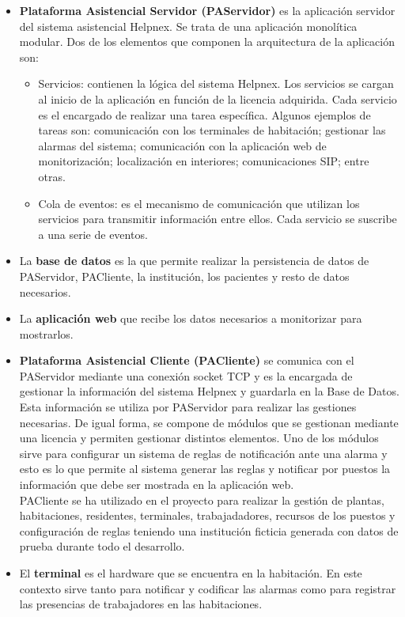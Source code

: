 \begin{itemize}
	\item \textbf{Plataforma Asistencial Servidor (PAServidor)} es la aplicación servidor del sistema asistencial Helpnex. Se trata de una aplicación monolítica modular. Dos de los elementos que componen la arquitectura de la aplicación son:
	\begin{itemize}
		\item Servicios: contienen la lógica del sistema Helpnex. Los servicios se cargan al inicio de la aplicación en función de la licencia adquirida. Cada servicio es el encargado de realizar una tarea específica. Algunos ejemplos de tareas son: comunicación con los terminales de habitación; gestionar las alarmas del sistema; comunicación con la aplicación web de monitorización; localización en interiores; comunicaciones SIP; entre otras.
		\item Cola de eventos: es el mecanismo de comunicación que utilizan los servicios para transmitir información entre ellos. Cada servicio se suscribe a una serie de eventos.
	\end{itemize}
	\item La \textbf{base de datos} es la que permite realizar la persistencia de datos de PAServidor, PACliente, la institución, los pacientes y resto de datos necesarios.
	\item La \textbf{aplicación web} que recibe los datos necesarios a monitorizar para mostrarlos.
	\item \textbf{Plataforma Asistencial Cliente (PACliente)} se comunica con el PAServidor mediante una conexión socket TCP y es la encargada de gestionar la información del sistema Helpnex y guardarla en la Base de Datos. Esta información se utiliza por PAServidor para realizar las gestiones necesarias. De igual forma, se compone de módulos que se gestionan mediante una licencia y permiten gestionar distintos elementos. Uno de los módulos sirve para configurar un sistema de reglas de notificación ante una alarma y esto es lo que permite al sistema generar las reglas y notificar por puestos la información que debe ser mostrada en la aplicación web.\\
	PACliente se ha utilizado en el proyecto  para realizar la gestión de plantas, habitaciones, residentes, terminales, trabajadadores, recursos de los puestos y configuración de reglas teniendo una institución ficticia generada con datos de prueba durante todo el desarrollo.
	\item El \textbf{terminal} es el hardware que se encuentra en la habitación. En este contexto sirve tanto para notificar y codificar las alarmas como para registrar las presencias de trabajadores en las habitaciones.
\end{itemize}

